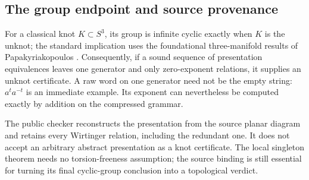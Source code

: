 \subsection{The group endpoint and source provenance}

For a classical knot $K\subset S^3$, its group is infinite cyclic exactly
when $K$ is the unknot; the standard implication uses the foundational
three-manifold results of Papakyriakopoulos \cite{Papakyriakopoulos1957}.
Consequently, if a sound sequence of presentation equivalences leaves one
generator and only zero-exponent relations, it supplies an unknot
certificate. A raw word on one generator need not be the empty string:
$a^t a^{-t}$ is an immediate example. Its exponent can nevertheless be
computed exactly by addition on the compressed grammar.

The public checker reconstructs the presentation from the source planar
diagram and retains every Wirtinger relation, including the redundant one.
It does not accept an arbitrary abstract presentation as a knot certificate.
The local singleton theorem needs no torsion-freeness assumption; the
source binding is still essential for turning its final cyclic-group
conclusion into a topological verdict.
